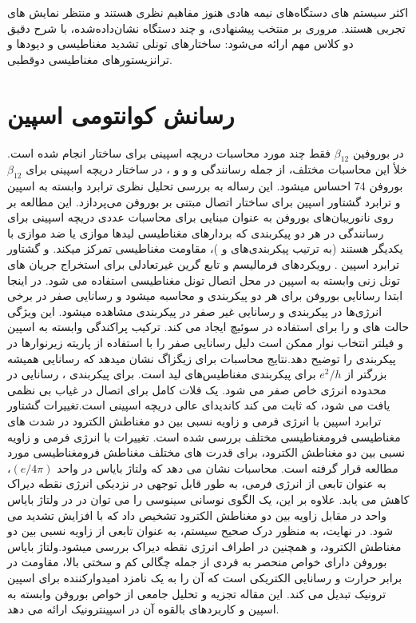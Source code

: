 اکثر سیستم های دستگاه‌های نیمه هادی هنوز مفاهیم نظری هستند و منتظر نمایش های تجربی هستند. مروری بر منتخب پیشنهادی، و چند دستگاه نشان‌داده‌شده، با شرح دقیق دو کلاس مهم ارائه می‌شود: ساختارهای تونلی تشدید مغناطیسی و دیودها و ترانزیستورهای مغناطیسی دوقطبی.

\section{رسانش کوانتومی اسپین}

در بوروفین $\beta_{12}$ فقط چند مورد محاسبات دریچه اسپینی برای ساختار  انجام شده است. خلأ این محاسبات مختلف، از جمله رسانندگی  و  و  و ، در ساختار  دریچه اسپینی برای $\beta_{12}$بوروفن 74 احساس میشود. این رساله به بررسی تحلیل نظری ترابرد وابسته به اسپین و ترابرد گشتاور اسپین برای  ساختار اتصال  مبتنی بر بوروفن می‌پردازد.  این مطالعه بر روی نانوریبان‌های بوروفن  به عنوان مبنایی برای محاسبات عددی دریچه اسپینی برای رسانندگی در هر دو پیکربندی که بردارهای مغناطیسی لیدها موازی یا ضد موازی با یکدیگر هستند (به ترتیب پیکربندی‌های  و )، مقاومت مغناطیسی  تمرکز میکند. و گشتاور ترابرد اسپین . رویکردهای فرمالیسم  و تابع گرین غیرتعادلی  برای استخراج جریان های تونل زنی وابسته به اسپین در محل اتصال تونل مغناطیسی  استفاده می شود. در اینجا ابتدا رسانایی بوروفن برای هر دو پیکربندی  و  محاسبه میشود و رسانایی صفر در برخی انرژی‌ها در پیکربندی  و رسانایی غیر صفر در پیکربندی  مشاهده میشود. این ویژگی حالت های  و  را برای استفاده در سوئیچ ایجاد می کند. ترکیب پراکندگی وابسته به اسپین و فیلتر انتخاب نوار ممکن است دلیل رسانایی صفر را با استفاده از پاریته زیر‌نوارها در پیکربندی  را توضیح دهد.نتایج محاسبات برای  زیگزاگ نشان میدهد که رسانایی همیشه بزرگتر از $e^2/h$ برای پیکربندی  مغناطیس‌های لید است. برای پیکربندی ، رسانایی در محدوده انرژی خاص صفر می شود. یک فلات  کامل برای اتصال در غیاب بی نظمی یافت می شود، که ثابت می کند کاندیدای عالی دریچه اسپینی است.تغییرات گشتاور ترابرد اسپین با انرژی فرمی و زاویه نسبی بین دو مغناطش الکترود در شدت های مغناطیسی فرومغناطیسی مختلف بررسی شده است. تغییرات  با انرژی فرمی و زاویه نسبی بین دو مغناطش الکترود، برای قدرت های مختلف مغناطش فرومغناطیسی مورد مطالعه قرار گرفته است. محاسبات نشان می دهد که ولتاژ بایاس  در واحد $(e/4\pi)$، به عنوان تابعی از انرژی فرمی، به طور قابل توجهی در نزدیکی انرژی نقطه دیراک کاهش می یابد. علاوه بر این، یک الگوی نوسانی سینوسی را می توان در  در ولتاژ بایاس واحد  در مقابل زاویه بین دو مغناطش الکترود تشخیص داد که با افزایش  تشدید می شود. در نهایت، به منظور درک صحیح سیستم،  به عنوان تابعی از زاویه نسبی بین دو مغناطش الکترود، و همچنین در اطراف انرژی نقطه دیراک بررسی میشود.ولتاژ بایاس  بوروفن دارای خواص منحصر به فردی از جمله چگالی کم و سختی بالا، مقاومت در برابر حرارت و رسانایی الکتریکی است که آن را به یک نامزد امیدوارکننده برای اسپین ترونیک تبدیل می کند. این مقاله تجزیه و تحلیل جامعی از خواص بوروفن وابسته به اسپین و کاربردهای بالقوه آن در اسپینترونیک ارائه می دهد.

